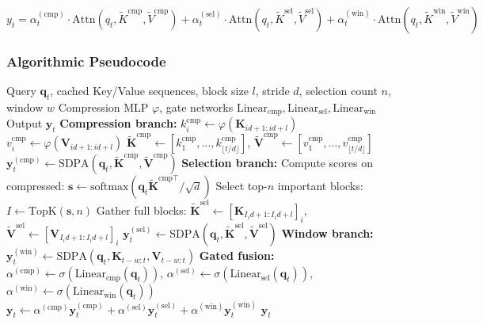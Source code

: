 \[
y_t = \alpha_t^{(\text{cmp})} \cdot \text{Attn}(q_t, \tilde{K}^{\text{cmp}}, \tilde{V}^{\text{cmp}}) + \alpha_t^{(\text{sel})} \cdot \text{Attn}(q_t, \tilde{K}^{\text{sel}}, \tilde{V}^{\text{sel}}) + \alpha_t^{(\text{win})} \cdot \text{Attn}(q_t, \tilde{K}^{\text{win}}, \tilde{V}^{\text{win}})
\]

\subsubsection{Algorithmic Pseudocode}

\begin{algorithm}[H]
\caption{NSA: Compressed + Selected + Window Branches with Learned Gating}
\begin{algorithmic}[1]
\Require Query $\mathbf{q}_t$, cached Key/Value sequences, block size $l$, stride $d$, selection count $n$, window $w$
\Require Compression MLP $\varphi$, gate networks $\text{Linear}_{\text{cmp}}, \text{Linear}_{\text{sel}}, \text{Linear}_{\text{win}}$
\Ensure Output $\mathbf{y}_t$
\State \textbf{Compression branch:}
    \State $k_i^{\text{cmp}} \gets \varphi(\mathbf{K}_{id+1:id+l})$ 
    \State $v_i^{\text{cmp}} \gets \varphi(\mathbf{V}_{id+1:id+l})$
\EndFor
\State $\tilde{\mathbf{K}}^{\text{cmp}} \gets [k_1^{\text{cmp}}, \ldots, k_{\lfloor t/d \rfloor}^{\text{cmp}}]$, $\tilde{\mathbf{V}}^{\text{cmp}} \gets [v_1^{\text{cmp}}, \ldots, v_{\lfloor t/d \rfloor}^{\text{cmp}}]$
\State $\mathbf{y}_t^{(\text{cmp})} \gets \text{SDPA}(\mathbf{q}_t, \tilde{\mathbf{K}}^{\text{cmp}}, \tilde{\mathbf{V}}^{\text{cmp}})$
\State \textbf{Selection branch:}
\State Compute scores on compressed: $\mathbf{s} \gets \text{softmax}(\mathbf{q}_t \tilde{\mathbf{K}}^{\text{cmp}\top} / \sqrt{d})$
\State Select top-$n$ important blocks: $I \gets \mathrm{TopK}(\mathbf{s}, n)$
\State Gather full blocks: $\tilde{\mathbf{K}}^{\text{sel}} \gets [\mathbf{K}_{I_i d+1:I_i d+l}]_i$, $\tilde{\mathbf{V}}^{\text{sel}} \gets [\mathbf{V}_{I_i d+1:I_i d+l}]_i$
\State $\mathbf{y}_t^{(\text{sel})} \gets \text{SDPA}(\mathbf{q}_t, \tilde{\mathbf{K}}^{\text{sel}}, \tilde{\mathbf{V}}^{\text{sel}})$
\State \textbf{Window branch:}
\State $\mathbf{y}_t^{(\text{win})} \gets \text{SDPA}(\mathbf{q}_t, \mathbf{K}_{t-w:t}, \mathbf{V}_{t-w:t})$
\State \textbf{Gated fusion:}
\State $\alpha^{(\text{cmp})} \gets \sigma(\text{Linear}_{\text{cmp}}(\mathbf{q}_t))$, $\alpha^{(\text{sel})} \gets \sigma(\text{Linear}_{\text{sel}}(\mathbf{q}_t))$, $\alpha^{(\text{win})} \gets \sigma(\text{Linear}_{\text{win}}(\mathbf{q}_t))$
\State $\mathbf{y}_t \gets \alpha^{(\text{cmp})} \mathbf{y}_t^{(\text{cmp})} + \alpha^{(\text{sel})} \mathbf{y}_t^{(\text{sel})} + \alpha^{(\text{win})} \mathbf{y}_t^{(\text{win})}$
\Return $\mathbf{y}_t$
\end{algorithmic}
\end{algorithm}

